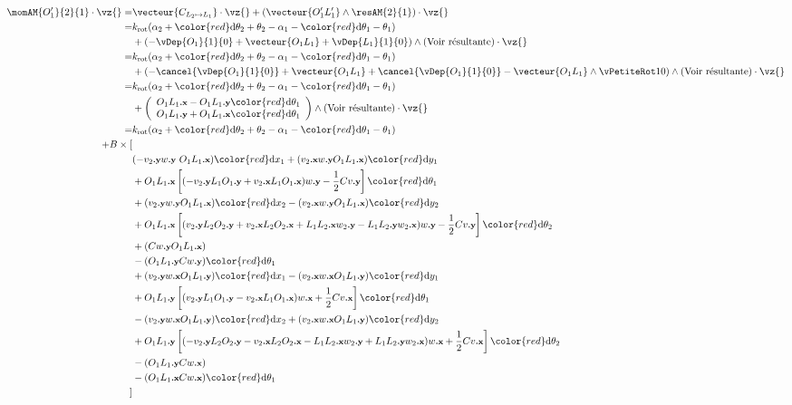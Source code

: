 \documentclass[a4paper,10pt]{article}
\renewcommand{\dx}[1]  {\ensuremath{{\color{red}\text{d}x_{#1}}}}
\renewcommand{\dy}[1]  {\ensuremath{{\color{red}\text{d}y_{#1}}}}
\renewcommand{\dtheta}[1]  {\ensuremath{{\color{red}\text{d}\theta_{#1}}}}
\newcommand{\px}{{\text{\footnotesize\textbf{.x}}}}
\newcommand{\py}{{\text{\footnotesize\textbf{.y}}}}
\newcommand{\krot}{\ensuremath{k_{\text{rot}}}}
\begin{document}
	\begin{align*}
        \momAM{O_1'}{2}{1}\cdot \vz{}  =&
            \vecteur{C_{L_2\mapsto L_1}}\cdot\vz{}+\left(\vecteur{O_1'L_1'}\wedge \resAM{2}{1}\right)\cdot\vz{}  \\
            =&
                \krot (\alpha_2+\dtheta2+\theta_2-\alpha_1-\dtheta1-\theta_1)\\
            &+\left(-\vDep{O_1}{1}{0}+\vecteur{O_1L_1}+\vDep{L_1}{1}{0}\right)\wedge
                \text{(Voir résultante)}\cdot\vz{}    \\
            =&    \krot (\alpha_2+\dtheta2+\theta_2-\alpha_1-\dtheta1-\theta_1)\\
            &+\left(-\cancel{\vDep{O_1}{1}{0}}+\vecteur{O_1L_1}+\cancel{\vDep{O_1}{1}{0}}-\vecteur{O_1L_1}\wedge\vPetiteRot10\right)\wedge
                \text{(Voir résultante)} \cdot \vz{}   \\
            =&    \krot (\alpha_2+\dtheta2+\theta_2-\alpha_1-\dtheta1-\theta_1)\\
            &+\left(
                    \begin{array}{c}
                        O_1L_1\px   -   O_1L_1\py\dtheta1   
                        \\O_1L_1\py +   O_1L_1\px\dtheta1
                    \end{array}
                \right)\wedge
                \text{(Voir résultante)} \cdot \vz{}   \\
            =& \krot (\alpha_2+\dtheta2+\theta_2-\alpha_1-\dtheta1-\theta_1)\\
            +B\times[&\\
            &(-v_2\py w\py\ O_1L_1\px)\dx1+(v_2\px w\py O_1L_1\px)\dy1\\
            &+O_1L_1\px\left[(-v_2\py L_1O_1\py+v_2\px L_1O_1\px)w\py-\frac 12 C v\py\right]\dtheta1\\
            &+(v_2\py w\py O_1L_1\px)\dx2-(v_2\px w\py O_1L_1\px)\dy2\\
            &+O_1L_1\px\left[(v_2\py L_2O_2\py+v_2\px L_2O_2\px+L_1L_2\px w_2\py-L_1L_2\py w_2\px)w\py-\frac12 C v\py\right]\dtheta2\\
            &+(Cw\py O_1L_1\px)\\
            &-(O_1L_1\py Cw\py)\dtheta1\\
            &+(v_2\py w\px O_1L_1\py)\dx1
            -(v_2\px w\px O_1L_1\py)\dy1\\
            &+O_1L_1\py\left[(v_2\py L_1O_1\py-v_2\px L_1O_1\px)w\px+\frac 12Cv\px\right]\dtheta1\\
            &-(v_2\py w\px O_1L_1\py)\dx2+(v_2\px w\px O_1L_1\py)\dy2\\
            &+O_1L_1\py\left[(-v_2\py L_2O_2\py-v_2\px L_2O_2\px-L_1L_2\px w_2\py+L_1L_2\py w_2\px)w\px+\frac12 C v\px\right]\dtheta2\\
            &-(O_1L_1\py C w\px)\\
            &-(O_1L_1\px C w\px) \dtheta1\\
            ]&
	\end{align*}
\end{document}
